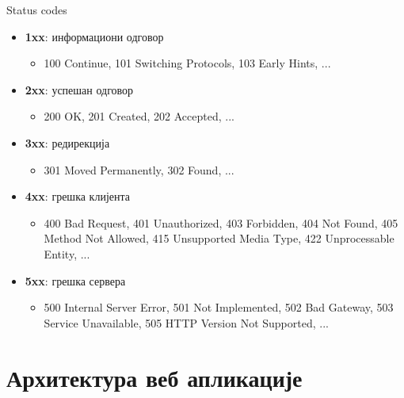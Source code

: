 \documentclass{beamer}
\begin{document}
    \begin{frame}{Status codes}
        \begin{itemize}
            \item \textbf{1xx}: информациони одговор
            \begin{itemize}
                \item 100 Continue, 101 Switching Protocols, 103 Early Hints, ...
            \end{itemize}
            \item \textbf{2xx}: успешан одговор
            \begin{itemize}
                \item 200 OK, 201 Created, 202 Accepted, ...
            \end{itemize}
            \item \textbf{3xx}: редирекција
            \begin{itemize}
                \item 301 Moved Permanently, 302 Found, ...
            \end{itemize}
            \item \textbf{4xx}: грешка клијента
            \begin{itemize}
                \item 400 Bad Request, 401 Unauthorized, 403 Forbidden, 404 Not Found, 405 Method Not Allowed, 415 Unsupported Media Type, 422 Unprocessable Entity, ...
            \end{itemize}
            \item \textbf{5xx}: грешка сервера
            \begin{itemize}
                \item 500 Internal Server Error, 501 Not Implemented, 502 Bad Gateway, 503 Service Unavailable, 505 HTTP Version Not Supported, ...
            \end{itemize}
        \end{itemize}
    \end{frame}

	\section{Архитектура веб апликације}
    
\end{document}
